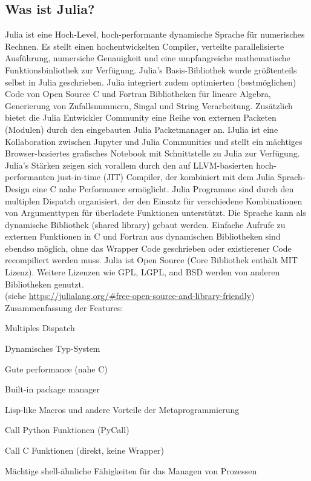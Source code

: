 \documentclass[11pt]{article}
\begin{document}
\subsection{Was ist Julia?}
Julia ist eine Hoch-Level, hoch-performante dynamische Sprache für numerisches Rechnen. Es stellt einen hochentwickelten Compiler, verteilte parallelisierte Ausführung, numersiche Genauigkeit und eine umpfangreiche mathematische Funktionsbinliothek zur Verfügung. Julia's Basis-Bibliothek wurde größtenteils selbst in Julia geschrieben. Julia integriert zudem optimierten (bestmöglichen) Code von Open Source C und Fortran Bibliotheken für lineare Algebra, Generierung von Zufallsnummern, Singal und String Verarbeitung. Zusätzlich bietet die Julia Entwickler Community eine Reihe von externen Packeten (Modulen) durch den eingebauten Julia Packetmanager an. IJulia ist eine Kollaboration zwischen Jupyter und Julia Communities und stellt ein mächtiges Browser-basiertes grafisches Notebook mit Schnittstelle zu Julia zur Verfügung. Julia's Stärken zeigen sich vorallem durch den auf LLVM-basierten hoch-performanten just-in-time (JIT) Compiler, der kombiniert mit dem Julia Sprach-Design eine C nahe Performance ermöglicht. Julia Programme sind durch den multiplen Dispatch organisiert, der  den Einsatz für verschiedene Kombinationen von Argumenttypen für überladete Funktionen unterstützt. Die Sprache kann als dynamische Bibliothek (shared library) gebaut werden. Einfache Aufrufe zu externen Funktionen in C und Fortran aus dynamischen Bibliotheken sind ebendso möglich, ohne das Wrapper Code geschrieben oder existierener Code recompiliert werden muss. Julia ist Open Source (Core Bibliothek enthält MIT Lizenz). Weitere Lizenzen wie GPL, LGPL, and BSD werden von anderen Bibliotheken genutzt.\\ (siehe \url{https://julialang.org/#free-open-source-and-library-friendly})\\

\hypertarget{basics}{Zusammenfassung der Features:}\\
\noindent{}

\begin{flushleft}
\begin{compactitem}
\item Multiples Dispatch
\item Dynamisches Typ-System
\item Gute performance (nahe C)
\item Built-in package manager
\item Lisp-like Macros und andere Vorteile der Metaprogrammierung
\item Call Python Funktionen (PyCall)
\item Call C Funktionen (direkt, keine Wrapper)
\item Mächtige shell-ähnliche Fähigkeiten für das Managen von Prozessen
\end{compactitem}
\end{flushleft}
\end{document}
